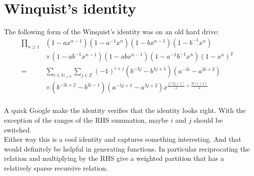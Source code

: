 \section{Winquist's identity}
The following form of the Winquist's identity was on an old hard drive:
\begin{equation*}
\begin{aligned}
	\prod_{n \geq 1}&(1-ax^{n-1})(1-a^{-1}x^n)(1-bx^{n-1})(1-b^{-1}x^{n}) \\
	&\times(1-ab^{-1}x^{n-1})(1-abx^{n-1})(1-a^{-1}b^{-1}x^{n})(1-x^n)^2 \\
	=& \sum_{i \in \mathbb{N}_{\geq 0}}\sum_{j\in\mathbb{Z}} (-1)^{i+j}(b^{-3j}-b^{3j+1})(a^{-3i}-a^{3i+3}) \\
	&\times(b^{-3i+2}-b^{3i-1})(a^{-3j+1}-a^{3j+2})x^{\frac{j(3j+1)}{2}+\frac{3i(i+1)}{2}} \\
\end{aligned}
\end{equation*}

A quick Google make the identity verifies that the identity looks right.
With the exception of the ranges of the RHS summation, maybe $i$ and $j$ should be switched.
\\

Either way this is a cool identity and captures something interesting.
And that would definitely be helpful in generating functions.
In particular reciprocating the relation and multiplying by the RHS give a weighted partition that has a relatively sparse recursive relation.
